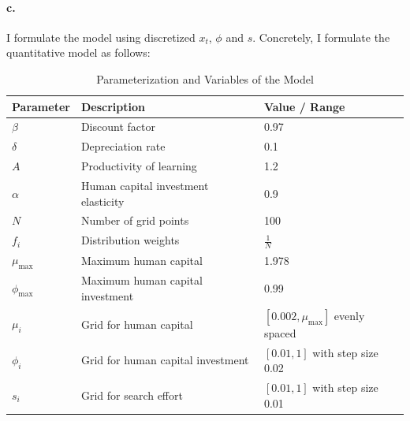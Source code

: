 \documentclass[11pt]{article}
\theoremstyle{definition}
\theoremstyle{boldtitle} %
\numberwithin{equation}{section}
\numberwithin{figure}{section}
\numberwithin{table}{section}
\begin{document}
\paragraph{c.}
I formulate the model using discretized $x_t$, $\phi$ and $s$.
Concretely, I formulate the quantitative model as follows:
\begin{table}[h!]
\centering
\caption{Parameterization and Variables of the Model}
\label{tab:parameterization}
\begin{tabular}{lll}
\hline
\textbf{Parameter}         & \textbf{Description}                            & \textbf{Value / Range}                     \\ \hline
$\beta$                    & Discount factor                                & 0.97                                       \\  
$\delta$                   & Depreciation rate                              & 0.1                                        \\  
$A$                        & Productivity of learning                       & 1.2                                        \\  
$\alpha$                   & Human capital investment elasticity            & 0.9                                        \\
$N$                        & Number of grid points                          & 100                                        \\
$f_i$           & Distribution weights                           & $\frac{1}{N}$                              \\
$\mu_{\text{max}}$         & Maximum human capital                          & 1.978                                      \\
$\phi_{\text{max}}$        & Maximum human capital investment               & 0.99                                       \\
$\mu_i$         & Grid for human capital                         & $[0.002, \mu_{\text{max}}]$ evenly spaced  \\
$\phi_i$        & Grid for human capital investment              & $[0.01, 1]$ with step size 0.02            \\
$s_i$           & Grid for search effort                         & $[0.01, 1]$ with step size 0.01            \\ \hline
\end{tabular}
\end{table}
\end{document}
